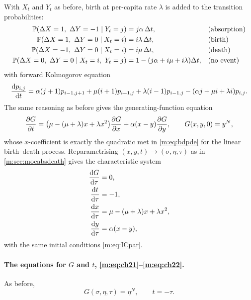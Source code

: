 With $X_t$ and $Y_t$ as before, birth at per-capita rate $\lambda$ is added to the
transition probabilities:
\begin{align*}
\mathbb{P}\!\left(\Delta X = 1,\ \Delta Y = -1 \mid Y_t=j\right) &= j\alpha\,\Delta t, &&\text{(absorption)}\\
\mathbb{P}\!\left(\Delta X = 1,\ \Delta Y = 0 \mid X_t=i\right) &= i\lambda\,\Delta t, &&\text{(birth)}\\
\mathbb{P}\!\left(\Delta X = -1,\ \Delta Y = 0 \mid X_t=i\right) &= i\mu\,\Delta t, &&\text{(death)}\\
\mathbb{P}\!\left(\Delta X = 0,\ \Delta Y = 0 \mid X_t=i,\ Y_t=j\right) &= 1-(j\alpha+i\mu+i\lambda)\Delta t, &&\text{(no event)}
\end{align*}
with forward Kolmogorov equation
\begin{equation}
\label{m:eq:FK3}
\frac{\mathrm{d} p_{i,j}}{\mathrm{d} t} = \alpha(j+1)p_{i-1,j+1} + \mu(i+1)p_{i+1,j} + \lambda(i-1)p_{i-1,j}
- (\alpha j+\mu i+\lambda i)p_{i,j} .
\end{equation}
The same reasoning as before gives the generating-function equation
\begin{equation}
\label{m:eq:PDE3}
\frac{\partial G}{\partial t} = \bigl(\mu-(\mu+\lambda)x+\lambda x^2\bigr)\frac{\partial G}{\partial x} + \alpha(x-y)\frac{\partial G}{\partial y},
\qquad G(x,y,0)=y^N ,
\end{equation}
whose $x$-coefficient is exactly the quadratic met in \cref{m:eq:bdpde} for the
linear birth--death process. Reparametrising $(x,y,t)\to(\sigma,\eta,\tau)$ as in
\cref{m:sec:mocabsdeath} gives the characteristic system
\begin{align}
\frac{\mathrm{d} G}{\mathrm{d} \tau} &= 0, \label{m:eq:ch21}\\
\frac{\mathrm{d} t}{\mathrm{d} \tau} &= -1, \label{m:eq:ch22}\\
\frac{\mathrm{d} x}{\mathrm{d} \tau} &= \mu-(\mu+\lambda)x+\lambda x^2, \label{m:eq:ch23}\\
\frac{\mathrm{d} y}{\mathrm{d} \tau} &= \alpha(x-y), \label{m:eq:ch24}
\end{align}
with the same initial conditions \cref{m:eq:ICpar}.

\paragraph{The equations for $G$ and $t$, \eqref{m:eq:ch21}--\eqref{m:eq:ch22}.}
As before,
\begin{equation}
\label{m:eq:GetaN2}
G(\sigma,\eta,\tau) = \eta^N,
\qquad
t = -\tau .
\end{equation}

